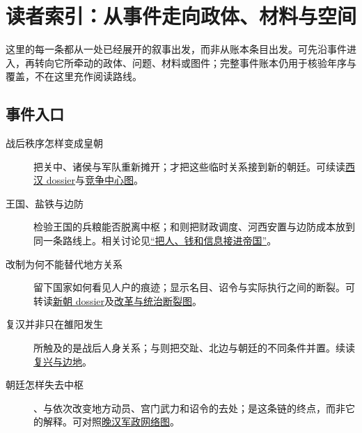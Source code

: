 \chapter{读者索引：从事件走向政体、材料与空间}
\label{app:index}

这里的每一条都从一处已经展开的叙事出发，而非从账本条目出发。可先沿事件进入，再转向它所牵动的政体、问题、材料或图件；完整事件账本仍用于核验年序与覆盖，不在这里充作阅读路线。

\section{事件入口}

\begin{description}
  \item[战后秩序怎样变成皇朝] 把关中、诸侯与军队重新摊开；才把这些临时关系接到新的朝廷。可续读\hyperref[sec:polity-western-han]{西汉 dossier}与\hyperref[fig:qin-han-centers]{竞争中心图}。
  \item[王国、盐铁与边防] 检验王国的兵粮能否脱离中枢；和则把财政调度、河西安置与边防成本放到同一条路线上。相关讨论见\hyperref[sec:han-imperial-capacity]{“把人、钱和信息接进帝国”}。
  \item[改制为何不能替代地方关系] 留下国家如何看见人户的痕迹；显示名目、诏令与实际执行之间的断裂。可转读\hyperref[sec:polity-xin]{新朝 dossier}及\hyperref[fig:xin-reform-fracture]{改革与统治断裂图}。
  \item[复汉并非只在雒阳发生] 所触及的是战后人身关系；与则把交趾、北边与朝廷的不同条件并置。续读\hyperref[sec:eastern-han-restoration]{复兴与边地}。
  \item[朝廷怎样失去中枢] 、与依次改变地方动员、宫门武力和诏令的去处；是这条链的终点，而非它的解释。可对照\hyperref[fig:late-han-regions]{晚汉军政网络图}。
\end{description}

